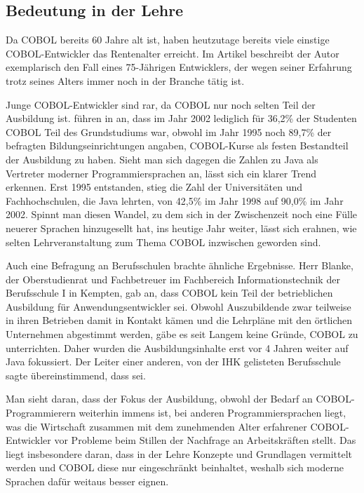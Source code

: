 \subsection*{Bedeutung in der Lehre}
Da COBOL bereits 60 Jahre alt ist, haben heutzutage bereits viele einstige COBOL-Entwickler das Rentenalter erreicht. Im Artikel  beschreibt der Autor exemplarisch den Fall eines 75-Jährigen Entwicklers, der wegen seiner Erfahrung trotz seines Alters immer noch in der Branche tätig ist.

Junge COBOL-Entwickler sind rar, da COBOL nur noch selten Teil der Ausbildung ist. \citeauthor{doke_cobol_2005} führen in  an, dass im Jahr 2002 lediglich für 36,2\% der Studenten COBOL Teil des Grundstudiums war, obwohl im Jahr 1995 noch 89,7\% der befragten Bildungseinrichtungen angaben, COBOL-Kurse als festen Bestandteil der Ausbildung zu haben. Sieht man sich dagegen die Zahlen zu Java als Vertreter moderner Programmiersprachen an, lässt sich ein klarer Trend erkennen. Erst 1995 entstanden, stieg die Zahl der Universitäten und Fachhochschulen, die Java lehrten, von 42,5\% im Jahr 1998 auf 90,0\% im Jahr 2002. Spinnt man diesen Wandel, zu dem sich in der Zwischenzeit noch eine Fülle neuerer Sprachen hinzugesellt hat, ins heutige Jahr weiter, lässt sich erahnen, wie selten Lehrveranstaltung zum Thema COBOL inzwischen geworden sind.

Auch eine Befragung an Berufsschulen brachte ähnliche Ergebnisse. Herr Blanke, der Oberstudienrat und Fachbetreuer im Fachbereich Informationstechnik der Berufsschule I in Kempten, gab an, dass COBOL kein Teil der betrieblichen Ausbildung für Anwendungsentwickler sei.  Obwohl Auszubildende zwar teilweise in ihren Betrieben damit in Kontakt kämen und die Lehrpläne mit den örtlichen Unternehmen abgestimmt werden, gäbe es seit Langem keine Gründe, COBOL zu unterrichten. Daher wurden die Ausbildungsinhalte erst vor 4 Jahren weiter auf Java fokussiert. Der Leiter einer anderen, von der IHK gelisteten Berufsschule sagte übereinstimmend, dass  sei.

Man sieht daran, dass der Fokus der Ausbildung, obwohl der Bedarf an COBOL-Programmierern weiterhin immens ist, bei anderen Programmiersprachen liegt, was die Wirtschaft zusammen mit dem zunehmenden Alter erfahrener COBOL-Entwickler vor Probleme beim Stillen der Nachfrage an Arbeitskräften stellt. Das liegt insbesondere daran, dass in der Lehre Konzepte und Grundlagen vermittelt werden und COBOL diese nur eingeschränkt beinhaltet, weshalb sich moderne Sprachen dafür weitaus besser eignen.

